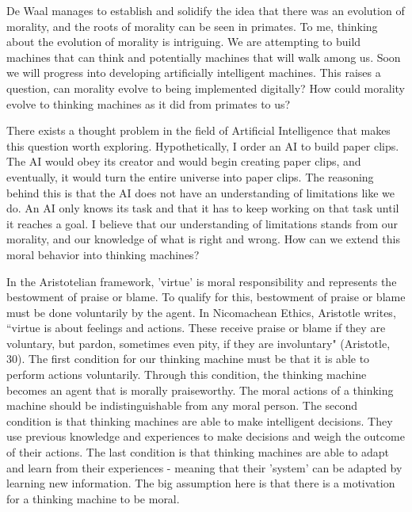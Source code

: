 \documentclass[11pt]{article}
\begin{document}
\par De Waal manages to establish and solidify the idea that there was an evolution of morality, and the roots of morality can be seen in primates. To me, thinking about the evolution of morality is intriguing. We are attempting to build machines that can think and potentially machines that will walk among us. Soon we will progress into developing artificially intelligent machines. This raises a question, can morality evolve to being implemented digitally? How could morality evolve to thinking machines as it did from primates to us?

\par There exists a thought problem in the field of Artificial Intelligence that makes this question worth exploring. Hypothetically, I order an AI to build paper clips. The AI would obey its creator and would begin creating paper clips, and eventually, it would turn the entire universe into paper clips. The reasoning behind this is that the AI does not have an understanding of limitations like we do. An AI only knows its task and that it has to keep working on that task until it reaches a goal. I believe that our understanding of limitations stands from our morality, and our knowledge of what is right and wrong. How can we extend this moral behavior into thinking machines?

\par In the Aristotelian framework, 'virtue' is moral responsibility and represents the bestowment of praise or blame. To qualify for this, bestowment of praise or blame must be done voluntarily by the agent. In Nicomachean Ethics, Aristotle writes, ``virtue is about feelings and actions. These receive praise or blame if they are voluntary, but pardon, sometimes even pity, if they are involuntary" (Aristotle, 30). The first condition for our thinking machine must be that it is able to perform actions voluntarily. Through this condition, the thinking machine becomes an agent that is morally praiseworthy. The moral actions of a thinking machine should be indistinguishable from any moral person. The second condition is that thinking machines are able to make intelligent decisions. They use previous knowledge and experiences to make decisions and weigh the outcome of their actions. The last condition is that thinking machines are able to adapt and learn from their experiences - meaning that their 'system' can be adapted by learning new information. The big assumption here is that there is a motivation for a thinking machine to be moral.
\end{document}
